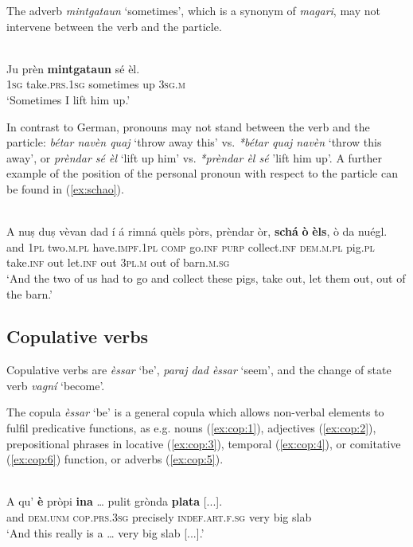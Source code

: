 The adverb \textit{mintgataun} `sometimes', which is a synonym of \textit{magari}, may not intervene between the verb and the particle.%

\ea
\label{17ex:pv:}
\\
\gll   *Ju prèn \textbf{mintgataun} sé èl. \\
     \textsc{1sg} take.\textsc{prs.1sg} sometimes up \textsc{3sg.m}\\
\glt `Sometimes I lift him up.'
\z

In contrast to German, pronouns may not stand between the verb and the particle: \textit{bétar navèn quaj} `throw away this' vs. \textit{*bétar quaj navèn} `throw this away', or \textit{prèndar sé èl} `lift up him' vs. \textit{*prèndar èl sé} 'lift him up'. A further example of the position of the personal pronoun with respect to the particle can be found in (\ref{ex:schao}).

\ea
\label{ex:schao}
\\
	\gll    A nuṣ duṣ vèvan dad í á rimná quèls pòrs, prèndar òr, \textbf{schá} \textbf{ò} \textbf{èls}, ò da nuégl.\\
	and \textsc{1pl} two.\textsc{m.pl} have.\textsc{impf.1pl} \textsc{comp} go.\textsc{inf}  \textsc{purp} collect.\textsc{inf} \textsc{dem.m.pl} pig.\textsc{pl} take.\textsc{inf} out  let.\textsc{inf} out \textsc{3pl.m} out of barn.\textsc{m.sg}\\
\glt `And the two of us had to go and collect these pigs, take out, let them out, out of the barn.'
\z


\subsection{Copulative verbs}
Copulative verbs are \textit{èssar} `be', \textit{paraj dad èssar} `seem', and the change of state verb \textit{vagní} `become'.

The copula \textit{èssar} `be' is a general copula which allows non-verbal elements to fulfil predicative functions, as e.g. nouns (\ref{ex:cop:1}), adjectives (\ref{ex:cop:2}), prepositional phrases in locative (\ref{ex:cop:3}), temporal (\ref{ex:cop:4}), or comitative (\ref{ex:cop:6}) function, or adverbs (\ref{ex:cop:5}).

\ea
\label{ex:cop:1}
\\
	\gll    A qu’ \textbf{è} pròpi \textbf{ina} … pulit grònda \textbf{plata} [...].\\
	and \textsc{dem.unm} \textsc{cop.prs.3sg} precisely \textsc{indef.art.f.sg} {} very big slab\\
\glt `And this really is a … very big slab [...].'
\z

